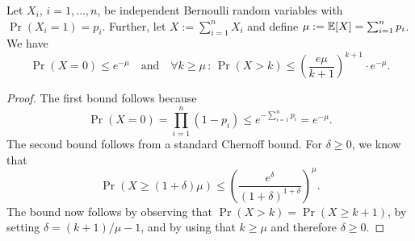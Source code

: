 \begin{lemma}\label{lemma:tailBounds}
  Let $X_i$, $i=1,\dots,n$, be independent Bernoulli random variables with $\Pr(X_i=1)=p_i$. Further, let $X:=\sum_{i=1}^n X_i$ and define $\mu:=\operatorname{\mathbb{E}}[X]=\sum_{i=1}^n p_i$. We have
  \[
  \Pr(X=0) \leq e^{-\mu}\quad\text{and}\quad
  \forall k\geq \mu \, : \, \Pr(X > k)\leq \left(\frac{e \mu}{k+1}\right)^{k+1}\cdot e^{-\mu}.
  \]
\end{lemma}
\begin{proof}
  The first bound follows because
  \[
  \Pr(X=0) = \prod_{i=1}^n (1-p_i) \leq e^{-\sum_{i=1}^n p_i} = e^{-\mu}.
  \]
  The second bound follows from a standard Chernoff bound. For $\delta\geq 0$, we know that
  \[
  \Pr(X\geq (1+\delta)\mu)\leq \left(\frac{e^\delta}{(1+\delta)^{1+\delta}}\right)^\mu.
  \]
  The bound now follows by observing that $\Pr(X>k)=\Pr(X\geq k+1)$, by setting $\delta = (k+1)/\mu - 1$, and by using that $k\geq \mu$ and therefore $\delta\geq 0$.
\end{proof}